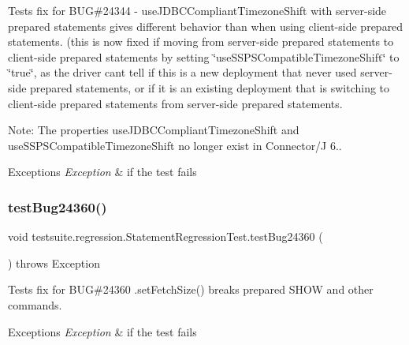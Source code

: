 Tests fix for B\+UG\#24344 -\/ use\+J\+D\+B\+C\+Compliant\+Timezone\+Shift with server-\/side prepared statements gives different behavior than when using client-\/side prepared statements. (this is now fixed if moving from server-\/side prepared statements to client-\/side prepared statements by setting \char`\"{}use\+S\+S\+P\+S\+Compatible\+Timezone\+Shift\char`\"{} to \char`\"{}true\char`\"{}, as the driver can\textquotesingle{}t tell if this is a new deployment that never used server-\/side prepared statements, or if it is an existing deployment that is switching to client-\/side prepared statements from server-\/side prepared statements.

Note\+: The properties \textquotesingle{}use\+J\+D\+B\+C\+Compliant\+Timezone\+Shift\textquotesingle{} and \textquotesingle{}use\+S\+S\+P\+S\+Compatible\+Timezone\+Shift\textquotesingle{} no longer exist in Connector/J 6..


\begin{DoxyExceptions}{Exceptions}
{\em Exception} & if the test fails \\
\hline
\end{DoxyExceptions}
\mbox{\label{classtestsuite_1_1regression_1_1_statement_regression_test_a3334c82a4ef7ac982bf6eca6fc081027}} 
\subsubsection{\texorpdfstring{test\+Bug24360()}{testBug24360()}}
{\footnotesize\ttfamily void testsuite.\+regression.\+Statement\+Regression\+Test.\+test\+Bug24360 (\begin{DoxyParamCaption}{ }\end{DoxyParamCaption}) throws Exception}

Tests fix for B\+UG\#24360 .set\+Fetch\+Size() breaks prepared S\+H\+OW and other commands.


\begin{DoxyExceptions}{Exceptions}
{\em Exception} & if the test fails \\
\hline
\end{DoxyExceptions}
\mbox{\label{classtestsuite_1_1regression_1_1_statement_regression_test_a857b7ade8c7c4e47bd7f0c8340d91386}} 
